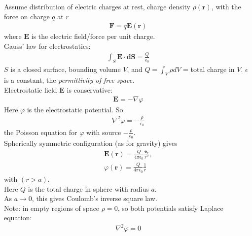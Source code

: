 \documentclass[a4paper]{article}
\begin{document}
\begin{eg}
Assume distribution of electric charges at rest,
charge density $\rho\left(\mathbf{r}\right)$, with the force on charge $q$ at $r$
\begin{equation*}
\begin{aligned}
\mathbf{F}=q\mathbf{E}\left(\mathbf{r}\right)
\end{aligned}
\end{equation*}
where $\mathbf{E}$ is the electric field/force per unit charge.\\
Gauss' law for electrostatics:
\begin{equation*}
\begin{aligned}
\int_S \mathbf{E}\cdot\mathbf{dS} = \frac{Q}{\epsilon_0}
\end{aligned}
\end{equation*}
$S$ is a closed surface, bounding volume $V$, and $Q = \int_V \rho dV$ = total charge in $V$. $\epsilon$ is a constant, the \emph{permittivity of free space}.\\
Electrostatic field $\mathbf{E}$ is conservative:
\begin{equation*}
\begin{aligned}
\mathbf{E} = -\nabla \varphi
\end{aligned}
\end{equation*}
Here $\varphi$ is the electrostatic potential. So
\begin{equation*}
\begin{aligned}
\nabla^2 \varphi = -\frac{\rho}{\epsilon_0}
\end{aligned}
\end{equation*}
the Poisson equation for $\varphi$ with source $-\frac{\rho}{\epsilon_0}$.\\
Spherically symmetric configuration (as for gravity) gives
\begin{equation*}
\begin{aligned}
\mathbf{E}\left(\mathbf{r}\right) = \frac{Q}{4\pi \epsilon_0} \frac{\mathbf{e}_r}{r^2},\\
\varphi\left(\mathbf{r}\right) = \frac{Q}{4\pi \epsilon_0}\frac{1}{r}
\end{aligned}
\end{equation*}
with $(r>a)$.\\
Here $Q$ is the total charge in sphere with radius $a$.\\
As $a\to 0$, this gives Coulomb's inverse square law.\\

Note: in empty regions of space $\rho=0$, so both potentials satisfy Laplace equation:
\begin{equation*}
\begin{aligned}
\nabla^2 \varphi = 0
\end{aligned}
\end{equation*}
\end{eg}
\end{document}

